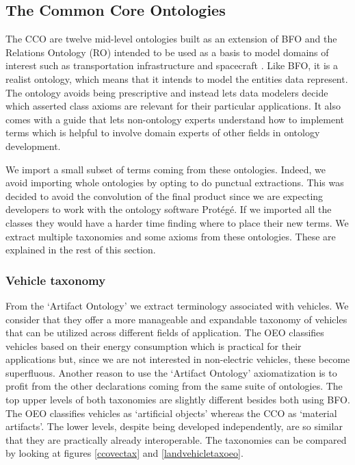 \subsection{The Common Core Ontologies}

The CCO are twelve mid-level ontologies built as an extension of BFO and the
Relations Ontology (RO) intended to be used as a basis to model domains of
interest such as transportation infrastructure and spacecraft
\cite{Rudnicki.23September2020}. Like BFO, it is a realist ontology, which
means that it intends to model the entities data represent. The ontology
avoids being prescriptive and instead lets data modelers decide which asserted
class axioms are relevant for their particular applications. It also comes with
a guide that lets non-ontology experts understand how to implement terms which
is helpful to involve domain experts of other fields in ontology development.

We import a small subset of terms coming from these ontologies. Indeed, we avoid
importing whole ontologies by opting to do punctual extractions. This was
decided to avoid the convolution of the final product since we are expecting
developers to work with the ontology software Protégé. If we imported all the
classes they would have a harder time finding where to place their new terms. We
extract multiple taxonomies and some axioms from these ontologies. These are
explained in the rest of this section.

\subsubsection{Vehicle taxonomy}

From the `Artifact Ontology' we extract terminology associated with vehicles. We
consider that they offer a more manageable and expandable taxonomy of vehicles
that can be utilized across different fields of application. The OEO classifies
vehicles based on their energy consumption which is practical for their
applications but, since we are not interested in non-electric vehicles, these
become superfluous. Another reason to use the `Artifact Ontology' axiomatization
is to profit from the other declarations coming from the same suite of
ontologies. The top upper levels of both taxonomies are slightly different
besides both using BFO. The OEO classifies vehicles as `artificial objects'
whereas the CCO as `material artifacts'. The lower levels, despite being
developed independently, are so similar that they are practically already
interoperable. The taxonomies can be compared by looking at figures
\ref{ccovectax} and \ref{landvehicletaxoeo}.

